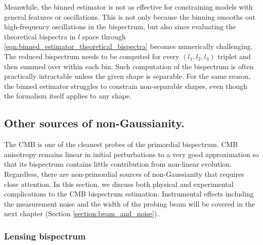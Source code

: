 Meanwhile, the binned estimator is not as effective for constraining models with general features or oscillations. This is not only because the binning smooths out high-frequency oscillations in the bispectrum, but also since evaluating the theoretical bispectra in $l$ space through \eqref{eqn:binned_estimator_theoretical_bispectra} becomes numerically challenging. The reduced bispectrum needs to be computed for every $(l_1,l_2,l_3)$ triplet and then summed over within each bin. Such computation of the bispectrum is often practically intractable unless the given shape is separable. For the same reason, the binned estimator struggles to constrain non-separable shapes, even though the formalism itself applies to any shape.


\subsection{Other sources of non-Gaussianity.} \label{section:other_sources_of_non_gaussianity}

The CMB is one of the cleanest probes of the primordial bispectrum. CMB anisotropy remains linear in initial perturbations to a very good approximation so that its bispectrum contains little contribution from non-linear evolution. Regardless, there are non-primordial sources of non-Gaussianity that requires close attention. In this section, we discuss both physical and experimental complications to the CMB bispectrum estimation. Instrumental effects including the measurement noise and the width of the probing beam will be covered in the next chapter (Section \ref{section:beam_and_noise}).


\subsubsection*{Lensing bispectrum}

